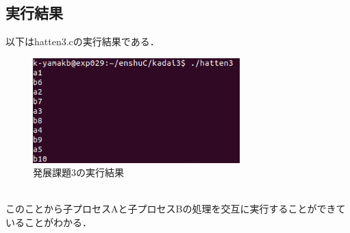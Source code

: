 \documentclass[dvipdfmx]{jarticle}
\begin{document}
\subsection{実行結果}
以下はhatten3.cの実行結果である．
\begin{figure}[h]
    \centering
    \includegraphics[width=8cm]{resulthatten3.png}
    \caption{発展課題3の実行結果}
\end{figure}
\\このことから子プロセスAと子プロセスBの処理を交互に実行することができていることがわかる．
\end{document}

